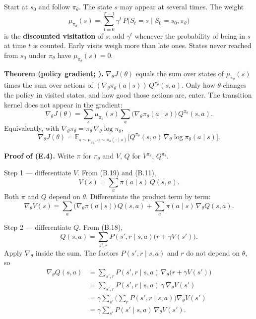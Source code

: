 Start at $s_0$ and follow $\pi_\theta$. The state $s$ may appear at several times. The weight \[
\mu_{\pi_\theta}(s)
=
\sum_{t=0}^{T-1}
\gamma^t\,P\bigl(S_t=s\mid S_0=s_0,\pi_\theta\bigr)
\] is the \textbf{discounted visitation} of $s$: add $\gamma^t$ whenever the probability of being in $s$ at time $t$ is counted. Early visits weigh more than late ones. States never reached from $s_0$ under $\pi_\theta$ have $\mu_{\pi_\theta}(s)=0$.

\textbf{Theorem (policy gradient; ).} $\nabla_\theta J(\theta)$ equals the sum over states of $\mu_{\pi_\theta}(s)$ times the sum over actions of $(\nabla_\theta\pi_\theta(a\mid s))\,Q^{\pi_\theta}(s,a)$. Only how $\theta$ changes the policy in visited states, and how good those actions are, enter. The transition kernel does not appear in the gradient: \begin{equation}
\nabla_\theta J(\theta)
=
\sum_s\mu_{\pi_\theta}(s)
\sum_a
\bigl(\nabla_\theta\pi_\theta(a\mid s)\bigr)\,
Q^{\pi_\theta}(s,a).
\tag{E.4}
\end{equation} Equivalently, with $\nabla_\theta\pi_\theta=\pi_\theta\,\nabla_\theta\log\pi_\theta$, \begin{equation}
\nabla_\theta J(\theta)
=
\mathbb{E}_{s\sim\mu_{\pi_\theta},\,a\sim\pi_\theta(\cdot\mid s)}
\bigl[
Q^{\pi_\theta}(s,a)\,
\nabla_\theta\log\pi_\theta(a\mid s)
\bigr].
\tag{E.5}
\end{equation}

\textbf{Proof of (E.4).} Write $\pi$ for $\pi_\theta$ and $V$, $Q$ for $V^{\pi_\theta}$, $Q^{\pi_\theta}$.

Step 1 --- differentiate $V$. From (B.19) and (B.11), \[
V(s)
=
\sum_a\pi(a\mid s)\,Q(s,a).
\] Both $\pi$ and $Q$ depend on $\theta$. Differentiate the product term by term: \begin{equation}
\nabla_\theta V(s)
=
\sum_a\bigl(\nabla_\theta\pi(a\mid s)\bigr)\,Q(s,a)
+
\sum_a\pi(a\mid s)\,\nabla_\theta Q(s,a).
\tag{*}
\end{equation}

Step 2 --- differentiate $Q$. From (B.18), \[
Q(s,a)
=
\sum_{s',r}P(s',r\mid s,a)\bigl(r+\gamma V(s')\bigr).
\] Apply $\nabla_\theta$ inside the sum. The factors $P(s',r\mid s,a)$ and $r$ do not depend on $\theta$, so \[
\begin{aligned}
\nabla_\theta Q(s,a)
&=
\sum_{s',r}P(s',r\mid s,a)\,\nabla_\theta\bigl(r+\gamma V(s')\bigr)
\\
&=
\sum_{s',r}P(s',r\mid s,a)\,\gamma\,\nabla_\theta V(s')
\\
&=
\gamma\sum_{s'}\Biggl(\sum_r P(s',r\mid s,a)\Biggr)\nabla_\theta V(s')
\\
&=
\gamma\sum_{s'}P(s'\mid s,a)\,\nabla_\theta V(s').
\end{aligned}
\]


